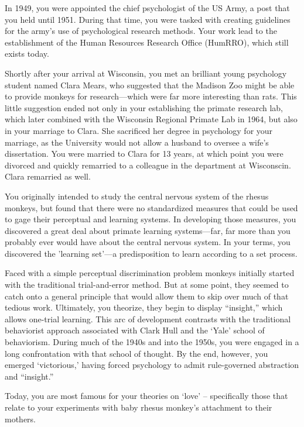 \begin{refsection}
In 1949, you were appointed the chief psychologist of the US Army, a post that you held until 1951. During that time, you were tasked with creating guidelines for the army's use of psychological research methods. Your work lead to the establishment of the Human Resources Research Office (HumRRO), which still exists today.

Shortly after your arrival at Wisconsin, you met an brilliant young psychology student named Clara Mears, who suggested that the Madison Zoo might be able to provide monkeys for research—which were far more interesting than rats. This little suggestion ended not only in your establishing the primate research lab, which later combined with the Wisconsin Regional Primate Lab in 1964, but also in your marriage to Clara. She sacrificed her degree in psychology for your marriage, as the University would not allow a husband to oversee a wife's dissertation. You were married to Clara for 13 years, at which point you were divorced and quickly remarried to a colleague in the department at Wisconscin. Clara remarried as well.

You originally intended to study the central nervous system of the rhesus monkeys, but found that there were no standardized measures that could be used to gage their perceptual and learning systems. In developing those measures, you discovered a great deal about primate learning systems—far, far more than you probably ever would have about the central nervous system. In your terms, you discovered the 'learning set'—a predisposition to learn according to a set process.

Faced with a simple perceptual discrimination problem monkeys initially started with the traditional trial-and-error method. But at some point, they seemed to catch onto a general principle that would allow them to skip over much of that tedious work. Ultimately, you theorize, they begin to display “insight,” which allows one-trial learning. This arc of development contrasts with the traditional behaviorist approach associated with Clark Hull and the `Yale' school of behaviorism. During much of the 1940s and into the 1950s, you were engaged in a long confrontation with that school of thought. By the end, however, you emerged `victorious,' having forced psychology to admit rule-governed abstraction and “insight.”

Today, you are most famous for your theories on `love' – specifically those that relate to your experiments with baby rhesus monkey's attachment to their mothers.


\end{refsection}
